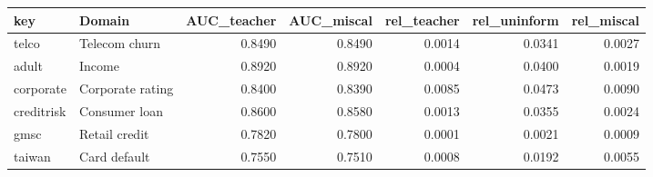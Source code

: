 \begin{tabular}{llrrrrr}
\toprule
key & Domain & AUC\_teacher & AUC\_miscal & rel\_teacher & rel\_uninform & rel\_miscal \\
\midrule
telco & Telecom churn & 0.8490 & 0.8490 & 0.0014 & 0.0341 & 0.0027 \\
adult & Income & 0.8920 & 0.8920 & 0.0004 & 0.0400 & 0.0019 \\
corporate & Corporate rating & 0.8400 & 0.8390 & 0.0085 & 0.0473 & 0.0090 \\
creditrisk & Consumer loan & 0.8600 & 0.8580 & 0.0013 & 0.0355 & 0.0024 \\
gmsc & Retail credit & 0.7820 & 0.7800 & 0.0001 & 0.0021 & 0.0009 \\
taiwan & Card default & 0.7550 & 0.7510 & 0.0008 & 0.0192 & 0.0055 \\
\bottomrule
\end{tabular}
